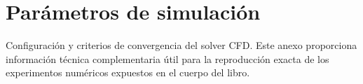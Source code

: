 \chapter{Parámetros de simulación}
\label{chap:anexoC}

Configuración y criterios de convergencia del solver CFD.
Este anexo proporciona información técnica complementaria útil para la reproducción exacta de los experimentos numéricos expuestos en el cuerpo del libro.
